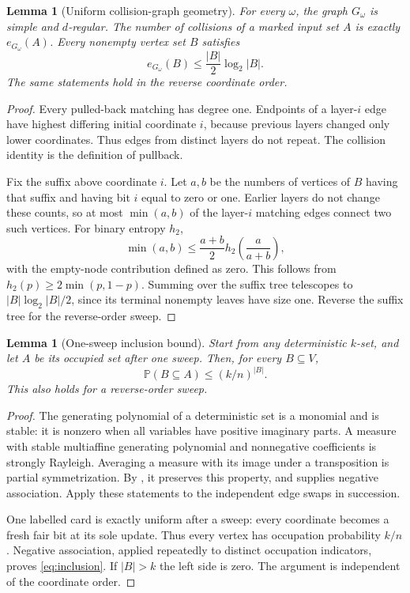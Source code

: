 \documentclass[11pt]{article}
\numberwithin{equation}{section}
\newtheorem{lemma}[theorem]{Lemma}
\theoremstyle{definition}\newtheorem{definition}[theorem]{Definition}
\theoremstyle{remark}\newtheorem{remark}[theorem]{Remark}
\newcommand{\Prb}{\mathbb P}
\begin{document}
\begin{lemma}[Uniform collision-graph geometry]\label{lem:graph}
For every $\omega$, the graph $G_\omega$ is simple and $d$-regular. The number
of collisions of a marked input set $A$ is exactly $e_{G_\omega}(A)$.
Every nonempty vertex set $B$ satisfies
\begin{equation}\label{eq:iso}
 e_{G_\omega}(B)\le\frac{|B|}{2}\log_2|B|.
\end{equation}
The same statements hold in the reverse coordinate order.
\end{lemma}
\begin{proof}
Every pulled-back matching has degree one. Endpoints of a layer-$i$ edge
have highest differing initial coordinate $i$, because previous layers
changed only lower coordinates. Thus edges from distinct layers do not
repeat. The collision identity is the definition of pullback.

Fix the suffix above coordinate $i$. Let $a,b$ be the numbers of vertices of
$B$ having that suffix and having bit $i$ equal to zero or one. Earlier
layers do not change these counts, so at most $\min(a,b)$ of the layer-$i$
matching edges connect two such vertices. For binary entropy $h_2$,
\[
 \min(a,b)\le\frac{a+b}{2}h_2\!\left(\frac a{a+b}\right),
\]
with the empty-node contribution defined as zero. This follows from
$h_2(p)\ge2\min(p,1-p)$. Summing over the suffix tree telescopes to
$|B|\log_2|B|/2$, since its terminal nonempty leaves have size one. Reverse
the suffix tree for the reverse-order sweep.
\end{proof}

\begin{lemma}[One-sweep inclusion bound]\label{lem:inclusion}
Start from any deterministic $k$-set, and let $A$ be its occupied set after
one sweep. Then, for every $B\subseteq V$,
\begin{equation}\label{eq:inclusion}
 \Prb(B\subseteq A)\le(k/n)^{|B|}.
\end{equation}
This also holds for a reverse-order sweep.
\end{lemma}
\begin{proof}
The generating polynomial of a deterministic set is a monomial and is
stable: it is nonzero when all variables have positive imaginary parts.
A measure with stable multiaffine generating polynomial and nonnegative
coefficients is strongly Rayleigh. Averaging a measure with its image under
a transposition is partial symmetrization. By \cite[Theorem~4.20]{BorceaBrandenLiggett2009}, it
preserves this property, and \cite[Theorem~4.9]{BorceaBrandenLiggett2009} supplies negative
association. Apply these statements to the independent edge swaps in
succession.

One labelled card is exactly uniform after a sweep: every coordinate
becomes a fresh fair bit at its sole update. Thus every vertex has
occupation probability $k/n$. Negative association, applied repeatedly to
distinct occupation indicators, proves \eqref{eq:inclusion}. If $|B|>k$ the
left side is zero. The argument is independent of the coordinate order.
\end{proof}
\end{document}
